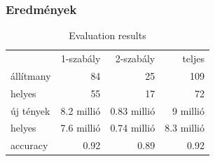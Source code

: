 \documentclass[bigger]{beamer}
\begin{document}
\begin{frame}
\frametitle{Eredmények}
\begin{table}
	\centering
	\begin{tabular}{lrrr}
		& 1-szabály & 2-szabály & teljes\\
		áll\'{i}tmany  & 84 & 25 & 109 \\
		helyes     & 55 & 17 & 72 \\
		új tények   & 8.2 millió & 0.83 millió & 9 millió \\
		helyes     & 7.6 millió & 0.74 millió & 8.3 millió \\ 
		accuracy    & 0.92 & 0.89 & 0.92
	\end{tabular}
	\caption{Evaluation results}
	\label{table:results}
\end{table}
\end{frame}
\end{document}
